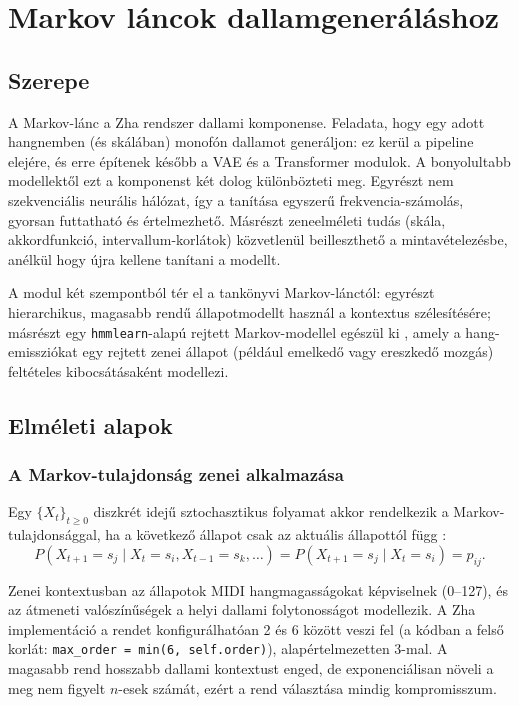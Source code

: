 \chapter{Markov láncok dallamgeneráláshoz}
\label{chap:markov}

\section{Szerepe}

A Markov-lánc a Zha rendszer dallami komponense. Feladata, hogy egy adott hangnemben (és skálában) monofón dallamot generáljon: ez kerül a pipeline elejére, és erre építenek később a VAE és a Transformer modulok. A bonyolultabb modellektől ezt a komponenst két dolog különbözteti meg. Egyrészt nem szekvenciális neurális hálózat, így a tanítása egyszerű frekvencia-számolás, gyorsan futtatható és értelmezhető. Másrészt zeneelméleti tudás (skála, akkordfunkció, intervallum-korlátok) közvetlenül beilleszthető a mintavételezésbe, anélkül hogy újra kellene tanítani a modellt.

A modul két szempontból tér el a tankönyvi Markov-lánctól: egyrészt hierarchikus, magasabb rendű állapotmodellt használ a kontextus szélesítésére; másrészt egy \texttt{hmmlearn}-alapú rejtett Markov-modellel egészül ki \cite{rabiner1989tutorial}, amely a hang-emissziókat egy rejtett zenei állapot (például emelkedő vagy ereszkedő mozgás) feltételes kibocsátásaként modellezi.

\section{Elméleti alapok}

\subsection{A Markov-tulajdonság zenei alkalmazása}

Egy $\{X_t\}_{t \geq 0}$ diszkrét idejű sztochasztikus folyamat akkor rendelkezik a Markov-tulajdonsággal, ha a következő állapot csak az aktuális állapottól függ \cite{norris1998markov}:
\[
P(X_{t+1} = s_j \mid X_t = s_i, X_{t-1} = s_k, \ldots) = P(X_{t+1} = s_j \mid X_t = s_i) = p_{ij}.
\]

Zenei kontextusban az állapotok MIDI hangmagasságokat képviselnek (0--127), és az átmeneti valószínűségek a helyi dallami folytonosságot modellezik. A Zha implementáció a rendet konfigurálhatóan 2 és 6 között veszi fel (a kódban a felső korlát: \texttt{max\_order = min(6, self.order)}), alapértelmezetten 3-mal. A magasabb rend hosszabb dallami kontextust enged, de exponenciálisan növeli a meg nem figyelt $n$-esek számát, ezért a rend választása mindig kompromisszum.

